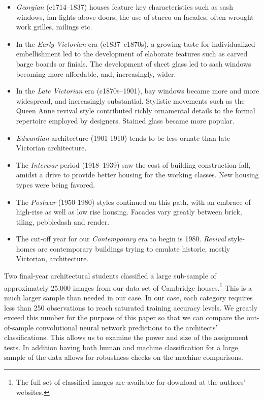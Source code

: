 \documentclass[]{article}
\begin{document}
\begin{itemize}
\item
  \emph{Georgian} (c1714--1837) houses feature key characteristics such
  as sash windows, fan lights above doors, the use of stucco on facades,
  often wrought work grilles, railings etc.\label{def_eras}
\item
  In the \emph{Early Victorian} era (c1837--c1870s), a growing taste for
  individualized embellishment led to the development of elaborate
  features such as carved barge boards or finials. The development of
  sheet glass led to sash windows becoming more affordable, and,
  increasingly, wider.
\item
  In the \emph{Late Victorian} era (c1870s--1901), bay windows became
  more and more widespread, and increasingly substantial. Stylistic
  movements such as the Queen Anne revival style contributed richly
  ornamental details to the formal repertoire employed by designers.
  Stained glass became more popular.
\item
  \emph{Edwardian} architecture (1901-1910) tends to be less ornate than
  late Victorian architecture.
\item
  The \emph{Interwar} period (1918--1939) saw the cost of building
  construction fall, amidst a drive to provide better housing for the
  working classes. New housing types were being favored.
\item
  The \emph{Postwar} (1950-1980) styles continued on this path, with an
  embrace of high-rise as well as low rise housing. Facades vary greatly
  between brick, tiling, pebbledash and render.
\item
  The cut-off year for our \emph{Contemporary} era to begin is 1980.
  \emph{Revival} style-homes are contemporary buildings trying to
  emulate historic, mostly Victorian, architecture.
\end{itemize}

Two final-year architectural students classified a large sub-sample of
approximately 25,000 images from our data set of Cambridge
houses.\footnote{The full set of classified images are available for download at the authors' websites.}
This is a much larger sample than needed in our case. In our case, each
category requires less than 250 observations to reach saturated training
accuracy levels. We greatly exceed this number for the purpose of this
paper so that we can compare the out-of-sample convolutional neural
network predictions to the architects' classifications. This allows us
to examine the power and size of the assignment tests. In addition
having both human and machine classification for a large sample of the
data allows for robustness checks on the machine comparisons.
\end{document}
